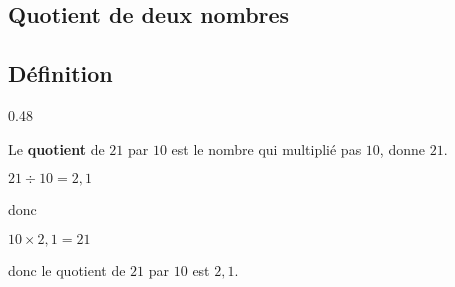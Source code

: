 \begin{pageCours}

\section{Quotient de deux nombres}

\subsection{Définition}

{0.48\linewidth}{\begin{Ex}
Le \textbf{quotient} de $21$ par $10$ est le nombre qui multiplié pas $10$, donne $21$.
\begin{center}
$21\div10=2,1$

donc

$10\times2,1=21$
\end{center}

donc le quotient de $21$ par $10$ est $2,1$.
\end{Ex}}


\end{pageCours}
